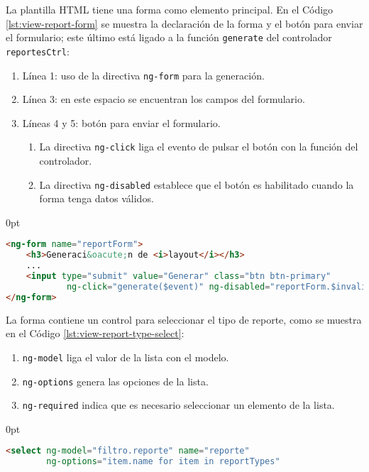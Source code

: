 \begin{enumerate}
La plantilla HTML tiene una forma como elemento principal. En el Código \ref{lst:view-report-form} se muestra la declaración de la forma y el botón para enviar el formulario; este último está ligado a la función \texttt{generate} del controlador \texttt{reportesCtrl}:
\begin{enumerate}
	\item Línea 1: uso de la directiva \texttt{ng-form} para la generación.
	\item Línea 3: en este espacio se encuentran los campos del formulario.
	\item Líneas 4 y 5: botón para enviar el formulario.
	\begin{enumerate}
		\item La directiva \texttt{ng-click} liga el evento de pulsar el botón con la función del controlador.
		\item La directiva \texttt{ng-disabled} establece que el botón es habilitado cuando la forma tenga datos válidos.
	\end{enumerate}
\end{enumerate}
\begin{adjustwidth}{\listingfixwidth}{0pt}
\begin{lstlisting}[language=HTML, captionpos=b, caption={Forma de generación de reportes.}, label={lst:view-report-form}]
<ng-form name="reportForm">
	<h3>Generaci&oacute;n de <i>layout</i></h3>
	...
	<input type="submit" value="Generar" class="btn btn-primary"
			ng-click="generate($event)" ng-disabled="reportForm.$invalid"/>	
</ng-form>
\end{lstlisting}
\end{adjustwidth}
La forma contiene un control para seleccionar el tipo de reporte, como se muestra en el Código \ref{lst:view-report-type-select}:
\begin{enumerate}
	\item \texttt{ng-model} liga el valor de la lista con el modelo.
	\item \texttt{ng-options} genera las opciones de la lista.
	\item \texttt{ng-required} indica que es necesario seleccionar un elemento de la lista.
\end{enumerate}
\begin{adjustwidth}{\listingfixwidth}{0pt}
\begin{lstlisting}[language=HTML, captionpos=b, caption={Lista para seleccionar el tipo de reporte.}, label={lst:view-report-type-select}]
<select ng-model="filtro.reporte" name="reporte"
		ng-options="item.name for item in reportTypes"

\end{lstlisting}
\end{adjustwidth}
\end{enumerate}
